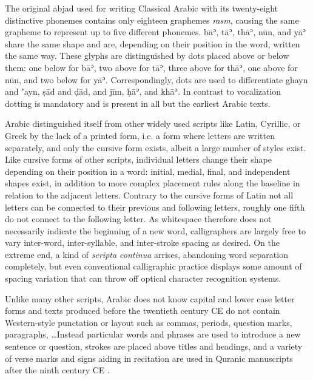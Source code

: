 The original abjad used for writing Classical Arabic with its twenty-eight
distinctive phonemes contains only eighteen graphemes \emph{rasm}, causing the
same grapheme to represent up to five different phonemes. bāʾ, tāʾ, thāʾ, nūn,
and yāʾ share the same shape and are, depending on their position in the word,
written the same way. These glyphs are distinguished by dots placed above or
below them: one below for bāʾ, two above for tāʾ, three above for thāʾ, one
above for nūn, and two below for yāʾ. Correspondingly, dots are used to
differentiate ghayn and ʼayn, ṣād and ḍād, and jīm, ḥāʾ, and khāʾ. In contrast
to vocalization dotting is mandatory and is present in all but the earliest
Arabic texts.

Arabic distinguished itself from other widely used scripts like Latin,
Cyrillic, or Greek by the lack of a printed form, i.e. a form where letters are
written separately, and only the cursive form exists, albeit a large number of
styles exist. Like cursive forms of other scripts, individual letters change
their shape depending on their position in a word: initial, medial, final, and
independent shapes exist, in addition to more complex placement rules along the
baseline in relation to the adjacent letters. Contrary to the cursive forms of
Latin not all letters can be connected to their previous and following letters,
roughly one fifth do not connect to the following letter. As whitespace
therefore does not necessarily indicate the beginning of a new word,
calligraphers are largely free to vary inter-word, inter-syllable, and
inter-stroke spacing as desired. On the extreme end, a kind of \emph{scripta
continua} arrises\cite[pg. 15]{blair2006islamic}, abandoning word separation
completely, but even conventional calligraphic practice displays some amount of
spacing variation that can throw off optical character recognition systems.

Unlike many other scripts, Arabic does not know capital and lower case letter
forms and texts produced before the twentieth century CE do not contain
Western-style punctation or layout such as commas, periods, question marks,
paragraphs, \dots Instead particular words and phrases are used to introduce a
new sentence or question, strokes are placed above titles and headings, and a
variety of verse marks and signs aiding in recitation are used in Quranic
manuscripts after the ninth century CE \cite{awad2015evolution}.

